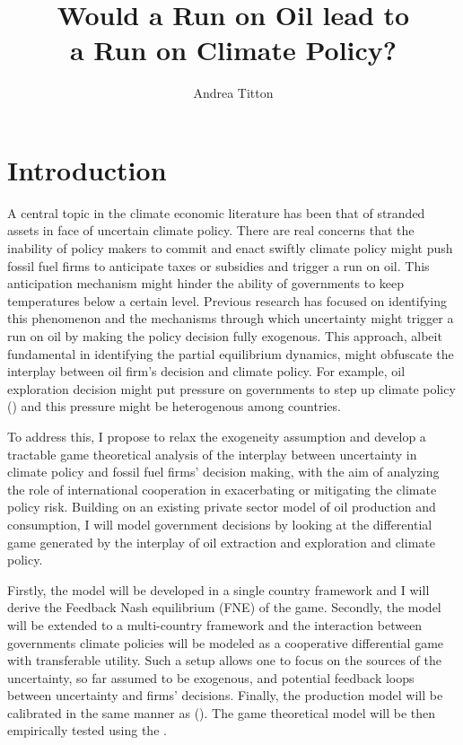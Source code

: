 \documentclass[american]{scrartcl}
\title{Would a Run on Oil lead to \\a Run on Climate Policy?}
\author{Andrea Titton}
\newcommand{\citein}[1]{\citeauthor{#1} (\citeyear{#1})}
\begin{document}
\maketitle


\section{Introduction}

A central topic in the climate economic literature has been that of stranded assets in face of uncertain climate policy. There are real concerns that the inability of policy makers to commit and enact swiftly climate policy might push fossil fuel firms to anticipate taxes or subsidies and trigger a run on oil. This anticipation mechanism might hinder the ability of governments to keep temperatures below a certain level. Previous research has focused on identifying this phenomenon and the mechanisms through which uncertainty might trigger a run on oil by making the policy decision fully exogenous. This approach, albeit fundamental in identifying the partial equilibrium dynamics, might obfuscate the interplay between oil firm's decision and climate policy. For example, oil exploration decision might put pressure on governments to step up climate policy (\cite{Ballew2019}) and this pressure might be heterogenous among countries.

To address this, I propose to relax the exogeneity assumption and develop a tractable game theoretical analysis of the interplay between uncertainty in climate policy and fossil fuel firms' decision making, with the aim of analyzing the role of international cooperation in exacerbating or mitigating the climate policy risk. Building on an existing private sector model of oil production and consumption, I will model government decisions by looking at the differential game generated by the interplay of oil extraction and exploration and climate policy.

Firstly, the model will be developed in a single country framework and I will derive the Feedback Nash equilibrium (FNE) of the game. Secondly, the model will be extended to a multi-country framework and the interaction between governments climate policies will be modeled as a cooperative differential game with transferable utility. Such a setup allows one to focus on the sources of the uncertainty, so far assumed to be exogenous, and potential feedback loops between uncertainty and firms' decisions. Finally, the production model will be calibrated in the same manner as \citein{Barnett2019}. The game theoretical model will be then empirically tested using the \citeauthor{Burck2020}.
\end{document}
